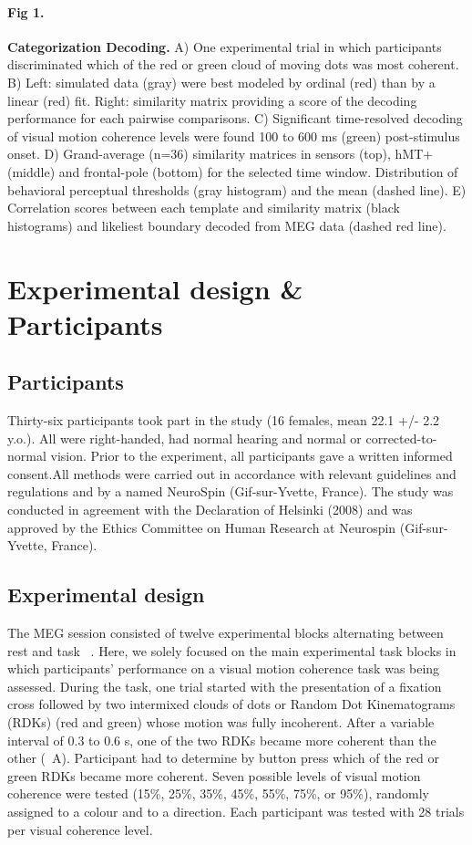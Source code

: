 \paragraph*{Fig 1.} \label{fig:fig1}
{\bf Categorization Decoding.} A) One experimental trial in which participants discriminated  which of the red or green cloud of moving dots was most coherent. B) Left: simulated data (gray) were best modeled by ordinal (red) than by a linear (red) fit. Right: similarity matrix providing a score of the decoding performance for each pairwise comparisons. C) Significant time-resolved decoding of visual motion coherence levels were found 100 to 600 ms (green) post-stimulus onset. D) Grand-average (n=36) similarity matrices in sensors (top), hMT+ (middle) and frontal-pole (bottom) for the selected time window. Distribution of behavioral perceptual thresholds (gray histogram) and the mean (dashed line). E) Correlation scores between each template and similarity matrix (black histograms) and likeliest boundary decoded from MEG data (dashed red line).


\section{Experimental design \& Participants}
\subsection*{Participants}
Thirty-six participants took part in the study (16 females, mean 22.1 +/- 2.2 y.o.). All were right-handed, had normal hearing and normal or corrected-to-normal vision. Prior to the experiment, all participants gave a written informed consent.All methods were carried out in accordance with relevant guidelines and regulations and by a named NeuroSpin (Gif-sur-Yvette, France). The study was conducted in agreement with the Declaration of Helsinki (2008) and was approved by the Ethics Committee on Human Research at Neurospin (Gif-sur-Yvette, France). 

\subsection*{Experimental design}
The MEG session consisted of twelve experimental blocks alternating between rest and task ~\cite{23zilber2014supramodal}. Here, we solely focused on the main experimental task blocks in which participants' performance on a visual motion coherence task was being assessed. During the task, one trial started with the presentation of a fixation cross followed by two intermixed clouds of dots or Random Dot Kinematograms (RDKs) (red and green) whose motion was fully incoherent. After a variable interval of 0.3 to 0.6 s, one of the two RDKs became more coherent than the other (~A). Participant had to determine by button press which of the red or green RDKs became more coherent. Seven possible levels of visual motion coherence were tested (15\%, 25\%, 35\%, 45\%, 55\%, 75\%, or 95\%), randomly assigned to a colour and to a direction. Each participant was tested with 28 trials per visual coherence level.


